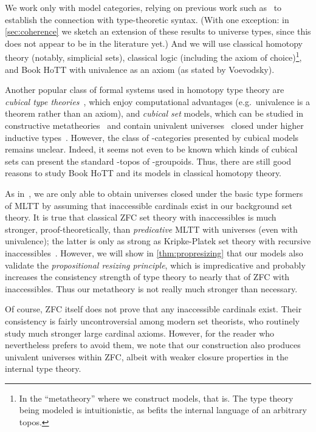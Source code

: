 \begin{rmk}\label{rmk:cubical}
  We work only with model categories, relying on previous work such as~\cite{aw:htpy-idtype,klv:ssetmodel,lw:localuniv,shulman:invdia,shulman:elreedy} to establish the connection with type-theoretic syntax.
  (With one exception: in \cref{sec:coherence} we sketch an extension of these results to universe types, since this does not appear to be in the literature yet.)
  And we will use classical homotopy theory (notably, simplicial sets), classical logic (including the axiom of choice)\footnote{In the ``metatheory'' where we construct models, that is.  The type theory being modeled is intuitionistic, as befits the internal language of an arbitrary topos.}, and Book HoTT with univalence as an axiom (as stated by Voevodsky).

  Another popular class of formal systems used in homotopy type theory are \emph{cubical type theories}~\cite{cchm:cubicaltt,ahw:chtt-i,ah:chtt-ii,abchhl:cart-cube,cm:unif-cartcube}, which enjoy computational advantages (e.g.\ univalence is a theorem rather than an axiom), and \emph{cubical set} models, which can be studied in constructive metatheories~\cite{bch:tt-cubical} and contain univalent universes~\cite{bch:univalence-cubical,ahh:chtt-iii} closed under higher inductive types~\cite{chm:cubical-hits,ch:chtt-iv}.
  However, the class of \io-categories presented by cubical models remains unclear.
  Indeed, it seems not even to be known which kinds of cubical sets can present the standard \io-topos of \oo-groupoids.
  Thus, there are still good reasons to study Book HoTT and its models in classical homotopy theory.
\end{rmk}

\begin{rmk}\label{rmk:pfthy}
  As in~\cite{klv:ssetmodel}, we are only able to obtain universes closed under the basic type formers of MLTT by assuming that inaccessible cardinals exist in our background set theory.
  It is true that classical ZFC set theory with inaccessibles is much stronger, proof-theoretically, than \emph{predicative} MLTT %
  with universes (even with univalence); the latter is only as strong as Kripke-Platek set theory with recursive inaccessibles~\cite{rathjen:pfthy-ua}.
  However, we will show in \cref{thm:propresizing} that our models also validate the \emph{propositional resizing principle}, which is impredicative and probably increases the consistency strength of type theory to nearly that of ZFC with inaccessibles.
  Thus our metatheory is not really much stronger than necessary.

  Of course, ZFC itself does not prove that any inaccessible cardinals exist.
  Their consistency is fairly uncontroversial among modern set theorists, who routinely study much stronger large cardinal axioms.
  However, for the reader who nevertheless prefers to avoid them, we note that our construction also produces univalent universes within ZFC, albeit with weaker closure properties in the internal type theory.
\end{rmk}




